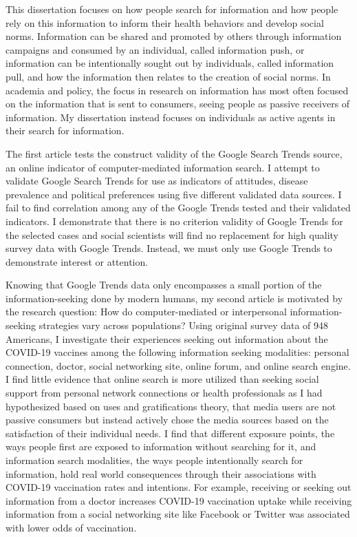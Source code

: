 
This dissertation focuses on how people search for information and how people
rely on this information to inform their health behaviors and develop social
norms. Information can be shared and promoted by others
through information campaigns and consumed by an individual, called information
push, or information can be intentionally sought out by individuals, 
called information pull, and how the information then relates to the
creation of social norms. In academia and policy, the focus in research on 
information has most often focused on the information that is sent to 
consumers, seeing people as passive receivers of information.
My dissertation instead focuses on individuals as active agents 
in their search for information.

The first article tests the construct validity of the Google Search Trends source,
an online indicator of computer-mediated information search. I attempt to
validate Google Search Trends for use as indicators of attitudes, disease prevalence
and political preferences using five different validated data sources. 
I fail to find correlation among any of the Google Trends tested and their
validated indicators. I demonstrate that there is no criterion validity of
Google Trends for the selected cases and social scientists will find no replacement for
high quality survey data with Google Trends. Instead, we must only use 
Google Trends to demonstrate interest or attention. 

Knowing that Google Trends data only encompasses a small portion of the
information-seeking done by modern humans, my second article 
is motivated by the research question: How do computer-mediated or interpersonal 
information-seeking strategies vary across populations? Using original survey data
of 948 Americans, I investigate their experiences seeking out information about 
the COVID-19 vaccines among the following information seeking modalities: 
personal connection, doctor, social networking site, online forum, and online search engine. 
I find little evidence that online search is more utilized than
seeking social support from personal network connections or health professionals
as I had hypothesized based on uses and gratifications theory, 
that media users are not passive consumers but instead actively chose
the media sources based on the satisfaction of their individual needs.
I find that different exposure points, the ways people first are exposed to 
information without searching for it, and information search modalities, the 
ways people intentionally search for information, hold real world consequences
through their associations with COVID-19 vaccination rates and intentions.
For example, receiving or seeking out information from a doctor increases 
 COVID-19 vaccination uptake while receiving information from a social 
 networking site like Facebook or Twitter was associated with lower odds of vaccination.

